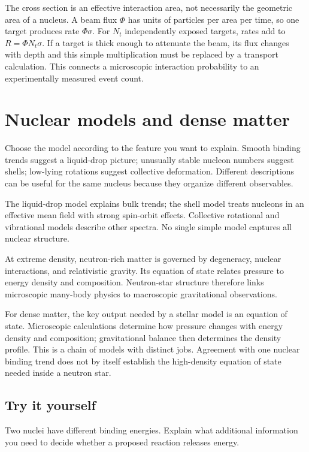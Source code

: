 \documentclass[11pt,oneside]{book}
\theoremstyle{reviewstyle}
\newcommand{\learningcheck}[1]{\subsection*{Try it yourself}\noindent #1\par}
\begin{document}
The cross section is an effective interaction area, not necessarily the geometric area of a nucleus. A beam flux $\Phi$ has units of particles per area per time, so one target produces rate $\Phi\sigma$. For $N_t$ independently exposed targets, rates add to $R=\Phi N_t\sigma$. If a target is thick enough to attenuate the beam, its flux changes with depth and this simple multiplication must be replaced by a transport calculation. This connects a microscopic interaction probability to an experimentally measured event count.

\section{Nuclear models and dense matter}
Choose the model according to the feature you want to explain. Smooth binding trends suggest a liquid-drop picture; unusually stable nucleon numbers suggest shells; low-lying rotations suggest collective deformation. Different descriptions can be useful for the same nucleus because they organize different observables.

The liquid-drop model explains bulk trends; the shell model treats nucleons in an effective mean field with strong spin-orbit effects. Collective rotational and vibrational models describe other spectra. No single simple model captures all nuclear structure.

At extreme density, neutron-rich matter is governed by degeneracy, nuclear interactions, and relativistic gravity. Its equation of state relates pressure to energy density and composition. Neutron-star structure therefore links microscopic many-body physics to macroscopic gravitational observations.

For dense matter, the key output needed by a stellar model is an equation of state. Microscopic calculations determine how pressure changes with energy density and composition; gravitational balance then determines the density profile. This is a chain of models with distinct jobs. Agreement with one nuclear binding trend does not by itself establish the high-density equation of state needed inside a neutron star.

\learningcheck{Two nuclei have different binding energies. Explain what additional information you need to decide whether a proposed reaction releases energy.}
\end{document}
